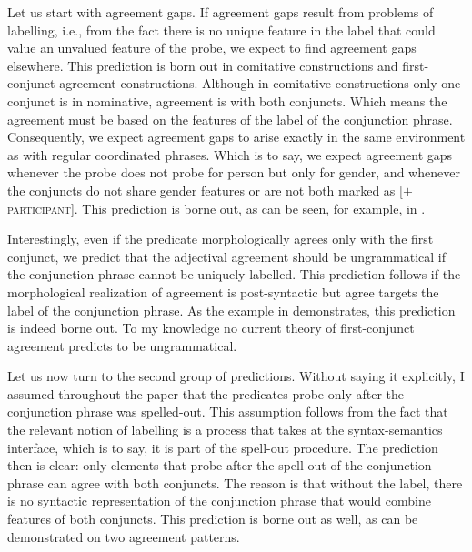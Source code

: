 \documentclass[output=paper,
modfonts
newtxmath,
hidelinks
]{langscibook}
\begin{document}
Let us start with agreement gaps. If agreement gaps result from problems of labelling, i.e., from the fact there is no unique feature in the label that could value an unvalued feature of the probe, we expect to find agreement gaps elsewhere. This prediction is born out in comitative constructions and first-conjunct agreement constructions. Although in comitative constructions only one conjunct is in nominative, agreement is with both conjuncts. Which means the agreement must be based on the features of the label of the conjunction phrase. Consequently, we expect agreement gaps to arise exactly in the same environment as with regular coordinated phrases. Which is to say, we expect agreement gaps whenever the probe does not probe for person but only for gender, and whenever the conjuncts do not share gender features or are not both marked as [$+$\textsc{participant}]. This prediction is borne out, as can be seen, for example, in .

\z

\noindent Interestingly, even if the predicate morphologically agrees only with the first conjunct, we predict that the adjectival agreement should be ungrammatical if the conjunction phrase cannot be uniquely labelled. This prediction follows if the morphological realization of agreement is post-syntactic but agree targets the label of the conjunction phrase. As the example in  demonstrates, this prediction is indeed borne out. To my knowledge no current theory of first-conjunct agreement predicts  to be ungrammatical.

\z

\noindent Let us now turn to the second group of predictions. Without saying it explicitly, I assumed throughout the paper that the predicates probe only after the conjunction phrase was spelled-out. This assumption follows from the fact that the relevant notion of labelling is a process that takes at the syntax-semantics interface, which is to say, it is part of the spell-out procedure. The prediction then is clear: only elements that probe after the spell-out of the conjunction phrase can agree with both conjuncts. The reason is that without the label, there is no syntactic representation of the conjunction phrase that would combine features of both conjuncts. This prediction is borne out as well, as can be demonstrated on two agreement patterns.
\end{document}
